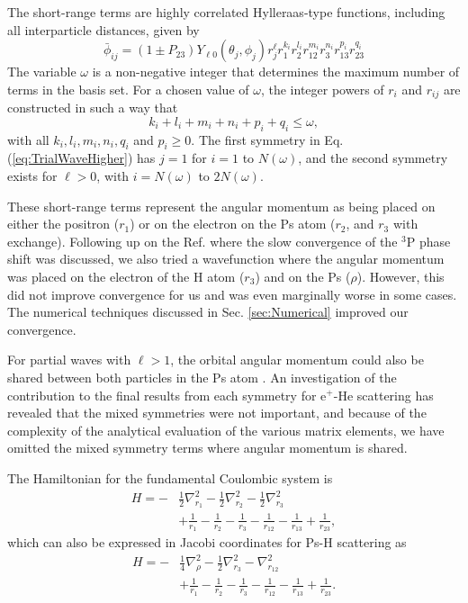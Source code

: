 \documentclass[reprint,showpacs,preprintnumbers,amsmath,amssymb,pra,aps]{revtex4-1}
\begin{document}
The short-range terms are highly correlated Hylleraas-type functions, including all interparticle distances, given by
\begin{equation}
\label{eq:PhiDef}
\bar{\phi}_{ij} = \left(1 \pm P_{23}\right) Y_{\ell 0}(\theta_j,\phi_j) r_j^{\ell} r_1^{k_i} r_2^{l_i} r_{12}^{m_i} r_3^{n_i} r_{13}^{p_i} r_{23}^{q_i}
\end{equation}
The variable $\omega$ is a non-negative integer that determines the maximum number of terms in the basis set. For a chosen value of $\omega$, the integer powers of $r_i$ and $r_{ij}$ are constructed in such a way that 
\begin{equation}
k_i + l_i + m_i + n_i + p_i + q_i \leq \omega,
\end{equation}
with all $k_i, l_i, m_i, n_i, q_i$ and $p_i \geq 0$.
The first symmetry in Eq. (\ref{eq:TrialWaveHigher}) has $j=1$ for $i=1$ to $N(\omega)$, and the second symmetry exists for $\ell > 0$, with $i = N(\omega)$ to $2N(\omega)$.

These short-range terms represent the angular momentum as being placed on either the positron ($r_1$) or on the electron on the Ps atom ($r_2$, and $r_3$ with exchange). Following up on the Ref. \cite{VanReeth2004} where the slow convergence of the $^3$P phase shift was discussed, we also tried a wavefunction where the angular momentum was placed on the electron of the H atom ($r_3$) and on the Ps ($\rho$). However, this did not improve convergence for us and was even marginally worse in some cases. The numerical techniques discussed in Sec. \ref{sec:Numerical} improved our convergence.

For partial waves with $\ell>1$, the orbital angular momentum could also be shared between both particles in the Ps atom \cite{Schwartz1961a}. An investigation of the contribution to the final results from each symmetry for e$^+$-He scattering \cite{VanReeth1997} has revealed that the mixed symmetries were not important, and because of the complexity of the analytical evaluation of the various matrix elements, we have omitted the mixed symmetry terms where angular momentum is shared.

The Hamiltonian for the fundamental Coulombic system is
\begin{align}
H = -&\frac{1}{2} \nabla_{r_1}^2 - \frac{1}{2} \nabla_{r_2}^2 - \frac{1}{2} \nabla_{r_3}^2  \nonumber \\
&+ \frac {1}{r_1}-\frac {1}{r_2}-\frac {1}{r_3}-\frac {1}{r_{12}}-\frac {1}{r_{13}}+\frac {1}{r_{23}},
\label{eq:Hamiltonian1}
\end{align}
which can also be expressed in Jacobi coordinates for Ps-H scattering as
\begin{align}
H = -&\frac{1}{4} \nabla_{\rho}^2 - \frac{1}{2} \nabla_{r_3}^2 - \nabla_{r_{12}}^2  \nonumber \\
&+ \frac {1}{r_1}-\frac {1}{r_2}-\frac {1}{r_3}-\frac {1}{r_{12}}-\frac {1}{r_{13}}+\frac {1}{r_{23}}.
\label{eq:Hamiltonian2}
\end{align}
\end{document}

